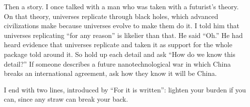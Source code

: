 Then a story. I once talked with a man who was taken with a futurist's theory. On that theory, universes replicate through black holes, which advanced civilizations make because universes evolve to make them do it. I told him that universes replicating ``for any reason'' is likelier than that. He said ``Oh.'' He had heard evidence that universes replicate and taken it as support for the whole package told around it. So hold up each detail and ask ``How do we know this detail?'' If someone describes a future nanotechnological war in which China breaks an international agreement, ask how they know it will be China.

I end with two lines, introduced by ``For it is written'': lighten your burden if you can, since any straw can break your back. 
